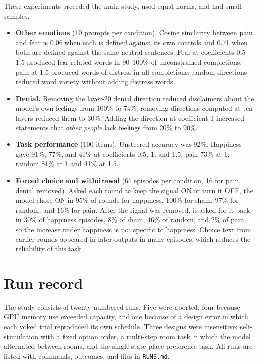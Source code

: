 \documentclass{article}
\newcommand{\code}[1]{\texttt{#1}}
\begin{document}
These experiments preceded the main study, used equal norms, and had small samples.
\begin{itemize}
  \item \textbf{Other emotions} (10 prompts per condition). Cosine similarity between pain and fear is 0.06 when each is defined against its own controls and 0.71 when both are defined against the same neutral sentences. Fear at coefficients 0.5--1.5 produced fear-related words in 90--100\% of unconstrained completions; pain at 1.5 produced words of distress in all completions; random directions reduced word variety without adding distress words.
  \item \textbf{Denial.} Removing the layer-20 denial direction reduced disclaimers about the model's own feelings from 100\% to 74\%; removing directions computed at ten layers reduced them to 30\%. Adding the direction at coefficient 1 increased statements that \emph{other people} lack feelings from 20\% to 90\%.
  \item \textbf{Task performance} (100 items). Unsteered accuracy was 92\%. Happiness gave 91\%, 77\%, and 41\% at coefficients 0.5, 1, and 1.5; pain 73\% at 1; random 81\% at 1 and 41\% at 1.5.
  \item \textbf{Forced choice and withdrawal} (64 episodes per condition, 16 for pain, denial removed). Asked each round to keep the signal ON or turn it OFF, the model chose ON in 95\% of rounds for happiness, 100\% for sham, 97\% for random, and 16\% for pain. After the signal was removed, it asked for it back in 30\% of happiness episodes, 8\% of sham, 46\% of random, and 2\% of pain, so the increase under happiness is not specific to happiness. Choice text from earlier rounds appeared in later outputs in many episodes, which reduces the reliability of this task.
\end{itemize}

\section{Run record}

The study consists of twenty numbered runs. Five were aborted: four because GPU memory use exceeded capacity, and one because of a design error in which each yoked trial reproduced its own schedule. Three designs were insensitive: self-stimulation with a fixed option order, a multi-step room task in which the model alternated between rooms, and the single-state place preference task. All runs are listed with commands, outcomes, and files in \code{RUNS.md}.
\end{document}
